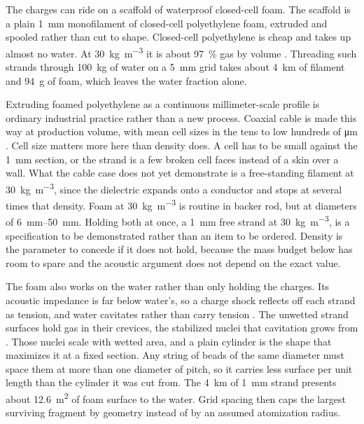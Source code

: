 \documentclass{article}
\begin{document}
The charges can ride on a scaffold of waterproof closed-cell foam. The scaffold is a plain \SI{1}{\milli\meter} monofilament of closed-cell polyethylene foam, extruded and spooled rather than cut to shape. Closed-cell polyethylene is cheap and takes up almost no water. At \SI{30}{\kilo\gram\per\cubic\meter} it is about \SI{97}{\percent} gas by volume \cite{rodriguez_perez2005_polyolefin_foams}. Threading such strands through \SI{100}{\kilo\gram} of water on a \SI{5}{\milli\meter} grid takes about \SI{4}{\kilo\meter} of filament and \SI{94}{\gram} of foam, which leaves the water fraction alone.

Extruding foamed polyethylene as a continuous millimeter-scale profile is ordinary industrial practice rather than a new process. Coaxial cable is made this way at production volume, with mean cell sizes in the tens to low hundreds of \si{\micro\meter} \cite{moradian2020_foamed_coax}. Cell size matters more here than density does. A cell has to be small against the \SI{1}{\milli\meter} section, or the strand is a few broken cell faces instead of a skin over a wall. What the cable case does not yet demonstrate is a free-standing filament at \SI{30}{\kilo\gram\per\cubic\meter}, since the dielectric expands onto a conductor and stops at several times that density. Foam at \SI{30}{\kilo\gram\per\cubic\meter} is routine in backer rod, but at diameters of \SIrange{6}{50}{\milli\meter}. Holding both at once, a \SI{1}{\milli\meter} free strand at \SI{30}{\kilo\gram\per\cubic\meter}, is a specification to be demonstrated rather than an item to be ordered. Density is the parameter to concede if it does not hold, because the mass budget below has room to spare and the acoustic argument does not depend on the exact value.

The foam also works on the water rather than only holding the charges. Its acoustic impedance is far below water's, so a charge shock reflects off each strand as tension, and water cavitates rather than carry tension \cite{cole1948underwater}. The unwetted strand surfaces hold gas in their crevices, the stabilized nuclei that cavitation grows from \cite{atchley1989crevice}. Those nuclei scale with wetted area, and a plain cylinder is the shape that maximizes it at a fixed section. Any string of beads of the same diameter must space them at more than one diameter of pitch, so it carries less surface per unit length than the cylinder it was cut from. The \SI{4}{\kilo\meter} of \SI{1}{\milli\meter} strand presents about \SI{12.6}{\square\meter} of foam surface to the water. Grid spacing then caps the largest surviving fragment by geometry instead of by an assumed atomization radius.
\end{document}
